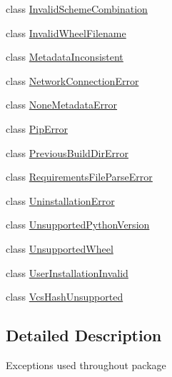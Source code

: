 \begin{DoxyCompactItemize}
\item 
class \hyperlink{classpip_1_1__internal_1_1exceptions_1_1InvalidSchemeCombination}{Invalid\+Scheme\+Combination}
\item 
class \hyperlink{classpip_1_1__internal_1_1exceptions_1_1InvalidWheelFilename}{Invalid\+Wheel\+Filename}
\item 
class \hyperlink{classpip_1_1__internal_1_1exceptions_1_1MetadataInconsistent}{Metadata\+Inconsistent}
\item 
class \hyperlink{classpip_1_1__internal_1_1exceptions_1_1NetworkConnectionError}{Network\+Connection\+Error}
\item 
class \hyperlink{classpip_1_1__internal_1_1exceptions_1_1NoneMetadataError}{None\+Metadata\+Error}
\item 
class \hyperlink{classpip_1_1__internal_1_1exceptions_1_1PipError}{Pip\+Error}
\item 
class \hyperlink{classpip_1_1__internal_1_1exceptions_1_1PreviousBuildDirError}{Previous\+Build\+Dir\+Error}
\item 
class \hyperlink{classpip_1_1__internal_1_1exceptions_1_1RequirementsFileParseError}{Requirements\+File\+Parse\+Error}
\item 
class \hyperlink{classpip_1_1__internal_1_1exceptions_1_1UninstallationError}{Uninstallation\+Error}
\item 
class \hyperlink{classpip_1_1__internal_1_1exceptions_1_1UnsupportedPythonVersion}{Unsupported\+Python\+Version}
\item 
class \hyperlink{classpip_1_1__internal_1_1exceptions_1_1UnsupportedWheel}{Unsupported\+Wheel}
\item 
class \hyperlink{classpip_1_1__internal_1_1exceptions_1_1UserInstallationInvalid}{User\+Installation\+Invalid}
\item 
class \hyperlink{classpip_1_1__internal_1_1exceptions_1_1VcsHashUnsupported}{Vcs\+Hash\+Unsupported}
\end{DoxyCompactItemize}


\subsection{Detailed Description}
\begin{DoxyVerb}Exceptions used throughout package\end{DoxyVerb}
 